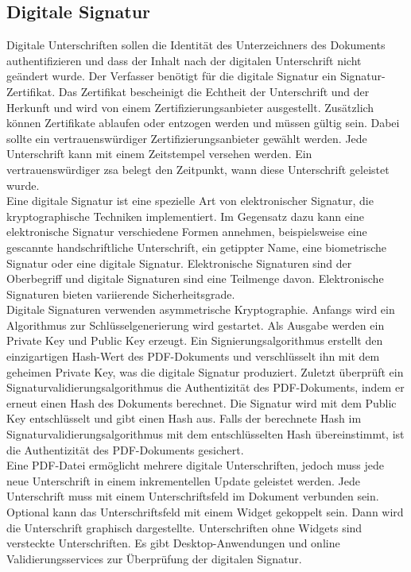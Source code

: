 \subsection{Digitale Signatur}
Digitale Unterschriften sollen die Identität des Unterzeichners des Dokuments authentifizieren und dass der Inhalt nach der digitalen Unterschrift nicht geändert wurde. Der Verfasser benötigt für die digitale Signatur ein Signatur-Zertifikat. Das Zertifikat bescheinigt die Echtheit der Unterschrift und der Herkunft und wird von einem Zertifizierungsanbieter ausgestellt. Zusätzlich können Zertifikate ablaufen oder entzogen werden und müssen gültig sein. Dabei sollte ein vertrauenswürdiger Zertifizierungsanbieter gewählt werden. Jede Unterschrift kann mit einem Zeitstempel versehen werden. Ein vertrauenswürdiger \gls{zsa} belegt den Zeitpunkt, wann diese Unterschrift geleistet wurde. \cite{softx} \\
Eine digitale Signatur ist eine spezielle Art von elektronischer Signatur, die kryptographische Techniken implementiert. Im Gegensatz dazu kann eine elektronische Signatur verschiedene Formen annehmen, beispielsweise eine gescannte handschriftliche Unterschrift, ein getippter Name, eine biometrische Signatur oder eine digitale Signatur. Elektronische Signaturen sind der Oberbegriff und digitale Signaturen sind eine Teilmenge davon. Elektronische Signaturen bieten variierende Sicherheitsgrade. \cite{adobe-pdf-pades} \\
Digitale Signaturen verwenden asymmetrische Kryptographie. Anfangs wird ein Algorithmus zur Schlüsselgenerierung wird gestartet. Als Ausgabe werden ein Private Key und Public Key erzeugt. Ein Signierungsalgorithmus erstellt den einzigartigen Hash-Wert des PDF-Dokuments und verschlüsselt ihn mit dem geheimen Private Key, was die digitale Signatur produziert. Zuletzt überprüft ein Signaturvalidierungsalgorithmus die Authentizität des PDF-Dokuments, indem er erneut einen Hash des Dokuments berechnet. Die Signatur wird mit dem Public Key entschlüsselt und gibt einen Hash aus. Falls der berechnete Hash im Signaturvalidierungsalgorithmus mit dem entschlüsselten Hash übereinstimmt, ist die Authentizität des PDF-Dokuments gesichert. \cite{signature} \\
Eine PDF-Datei ermöglicht mehrere digitale Unterschriften, jedoch muss jede neue Unterschrift in einem inkrementellen Update geleistet werden. Jede Unterschrift muss mit einem Unterschriftsfeld im Dokument verbunden sein. Optional kann das Unterschriftsfeld mit einem Widget gekoppelt sein. Dann wird die Unterschrift graphisch dargestellte. Unterschriften ohne Widgets sind versteckte Unterschriften. \cite{softx} Es gibt Desktop-Anwendungen und online Validierungsservices zur Überprüfung der digitalen Signatur.




